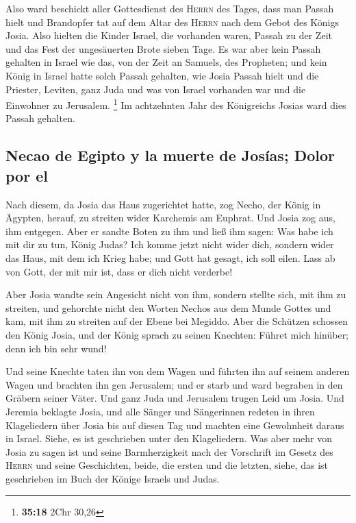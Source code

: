  Also ward beschickt aller Gottesdienst des
\textsc{Herrn} des Tages, dass man Passah hielt und Brandopfer tat auf
dem Altar des \textsc{Herrn} nach dem Gebot des Königs Josia.
 Also hielten die Kinder Israel, die vorhanden waren,
Passah zu der Zeit und das Fest der ungesäuerten Brote sieben Tage.
 Es war aber kein Passah gehalten in Israel wie das, von
der Zeit an Samuels, des Propheten; und kein König in Israel hatte solch
Passah gehalten, wie Josia Passah hielt und die Priester, Leviten, ganz
Juda und was von Israel vorhanden war und die Einwohner zu Jerusalem.
\footnote{\textbf{35:18} 2Chr 30,26}  Im achtzehnten Jahr
des Königreichs Josias ward dies Passah gehalten.

\hypertarget{necao-de-egipto-y-la-muerte-de-josuxedas-dolor-por-el}{%
\subsection{Necao de Egipto y la muerte de Josías; Dolor por
el}\label{necao-de-egipto-y-la-muerte-de-josuxedas-dolor-por-el}}

 Nach diesem, da Josia das Haus zugerichtet hatte, zog
Necho, der König in Ägypten, herauf, zu streiten wider Karchemis am
Euphrat. Und Josia zog aus, ihm entgegen.  Aber er sandte
Boten zu ihm und ließ ihm sagen: Was habe ich mit dir zu tun, König
Judas? Ich komme jetzt nicht wider dich, sondern wider das Haus, mit dem
ich Krieg habe; und Gott hat gesagt, ich soll eilen. Lass ab von Gott,
der mit mir ist, dass er dich nicht verderbe!

 Aber Josia wandte sein Angesicht nicht von ihm, sondern
stellte sich, mit ihm zu streiten, und gehorchte nicht den Worten Nechos
aus dem Munde Gottes und kam, mit ihm zu streiten auf der Ebene bei
Megiddo.  Aber die Schützen schossen den König Josia, und
der König sprach zu seinen Knechten: Führet mich hinüber; denn ich bin
sehr wund!

 Und seine Knechte taten ihn von dem Wagen und führten
ihn auf seinem anderen Wagen und brachten ihn gen Jerusalem; und er
starb und ward begraben in den Gräbern seiner Väter. Und ganz Juda und
Jerusalem trugen Leid um Josia.  Und Jeremia beklagte
Josia, und alle Sänger und Sängerinnen redeten in ihren Klageliedern
über Josia bis auf diesen Tag und machten eine Gewohnheit daraus in
Israel. Siehe, es ist geschrieben unter den Klageliedern.
 Was aber mehr von Josia zu sagen ist und seine
Barmherzigkeit nach der Vorschrift im Gesetz des \textsc{Herrn}
 und seine Geschichten, beide, die ersten und die
letzten, siehe, das ist geschrieben im Buch der Könige Israels und
Judas.

